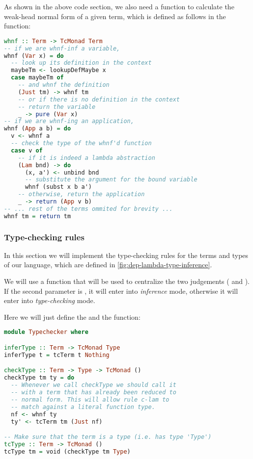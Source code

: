 As shown in the above code section, we also need a function to calculate the weak-head normal form of a given term, which is defined as follows in the  function:

\begin{lstlisting}[language=Haskell]
whnf :: Term -> TcMonad Term
-- if we are whnf-inf a variable,
whnf (Var x) = do
  -- look up its definition in the context
  maybeTm <- lookupDefMaybe x
  case maybeTm of
    -- and whnf the definition
    (Just tm) -> whnf tm
    -- or if there is no definition in the context
    -- return the variable 
    _ -> pure (Var x)
-- if we are whnf-ing an application,
whnf (App a b) = do
  v <- whnf a
  -- check the type of the whnf'd function
  case v of
    -- if it is indeed a lambda abstraction
    (Lam bnd) -> do
      (x, a') <- unbind bnd
      -- substitute the argument for the bound variable
      whnf (subst x b a')
    -- otherwise, return the application
    _ -> return (App v b)
-- ... rest of the terms ommited for brevity ...
whnf tm = return tm
\end{lstlisting}

\subsubsection{Type-checking rules}

In this section we will implement the type-checking rules for the terms and types of our language, which are defined in \autoref{fig:dep-lambda-type-inference}.

We will use a  function that will be used to centralize the two judgements ( and ). If the second parameter is , it will enter into \emph{inference} mode, otherwise it will enter into \emph{type-checking} mode.

Here we will just define the  and the  function:

\begin{lstlisting}[language=Haskell]
module Typechecker where

inferType :: Term -> TcMonad Type
inferType t = tcTerm t Nothing

checkType :: Term -> Type -> TcMonad ()
checkType tm ty = do
  -- Whenever we call checkType we should call it
  -- with a term that has already been reduced to 
  -- normal form. This will allow rule c-lam to
  -- match against a literal function type.
  nf <- whnf ty
  ty' <- tcTerm tm (Just nf)

-- Make sure that the term is a type (i.e. has type 'Type')
tcType :: Term -> TcMonad ()
tcType tm = void (checkType tm Type)
\end{lstlisting}

